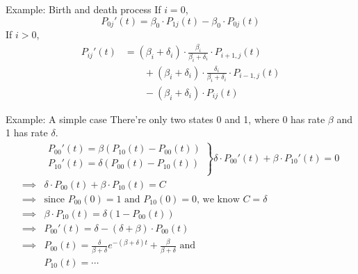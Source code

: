 \documentclass[mathserif]{beamer}
\begin{document}
\begin{frame}{Example: Birth and death process}
If $i = 0$,
\[
{P_{0j}}'(t) = \beta_0\cdot P_{1j}(t) - \beta_0\cdot P_{0j}(t)
\]
If $i > 0$,
\begin{align*}
{P_{ij}}'(t) & = (\beta_i + \delta_i)\cdot \frac{\beta_i}{\beta_i + \delta_i}\cdot P_{i+1,j}(t) \\
& \qquad + (\beta_i + \delta_i)\cdot \frac{\delta_i}{\beta_i + \delta_i}\cdot P_{i-1,j}(t) \\
& \qquad - (\beta_i + \delta_i)\cdot P_{ij}(t)
\end{align*}
\end{frame}

\begin{frame}{Example: A simple case}
There're only two states 0 and 1, where 0 has rate $\beta$ and 1 has rate $\delta$.
\begin{align*}
& \left.
\begin{array}{l}
{P_{00}}'(t) = \beta (P_{10}(t) - P_{00}(t)) \\
{P_{10}}'(t) = \delta (P_{00}(t) - P_{10}(t)) \\
\end{array}
\right\} \delta\cdot {P_{00}}'(t) + \beta\cdot {P_{10}}'(t) = 0 \\
\implies & \delta\cdot P_{00}(t) + \beta\cdot P_{10}(t) = C \\
\implies & \text{since $P_{00}(0) = 1$ and $P_{10}(0) = 0$, we know } C = \delta \\
\implies & \beta\cdot P_{10}(t) = \delta(1 - P_{00}(t)) \\
\implies & {P_{00}}'(t) = \delta - (\delta + \beta)\cdot P_{00}(t) \\
\implies & P_{00}(t) = \frac{\delta}{\beta + \delta} e^{-(\beta + \delta)t}
 + \frac{\beta}{\beta + \delta} \text{ and} \\
& P_{10}(t) = \cdots
\end{align*}
\end{frame}
\end{document}
